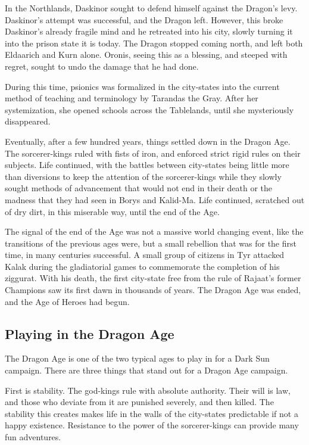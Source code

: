 In the Northlands, Daskinor sought to defend himself against the Dragon's levy. Daskinor's attempt was successful, and the Dragon left. However, this broke Daskinor's already fragile mind and he retreated into his city, slowly turning it into the prison state it is today. The Dragon stopped coming north, and left both Eldaarich and Kurn alone. Oronis, seeing this as a blessing, and steeped with regret, sought to undo the damage that he had done.

During this time, psionics was formalized in the city-states into the current method of teaching and terminology by Tarandas the Gray. After her systemization, she opened schools across the Tablelands, until she mysteriously disappeared.

Eventually, after a few hundred years, things settled down in the Dragon Age. The sorcerer-kings ruled with fists of iron, and enforced strict rigid rules on their subjects. Life continued, with the battles between city-states being little more than diversions to keep the attention of the sorcerer-kings while they slowly sought methods of advancement that would not end in their death or the madness that they had seen in Borys and Kalid-Ma. Life continued, scratched out of dry dirt, in this miserable way, until the end of the Age.

The signal of the end of the Age was not a massive world changing event, like the transitions of the previous ages were, but a small rebellion that was for the first time, in many centuries successful. A small group of citizens in Tyr attacked Kalak during the gladiatorial games to commemorate the completion of his ziggurat. With his death, the first city-state free from the rule of Rajaat's former Champions saw its first dawn in thousands of years. The Dragon Age was ended, and the Age of Heroes had begun.

\subsection{Playing in the Dragon Age}
The Dragon Age is one of the two typical ages to play in for a Dark Sun campaign. There are three things that stand out for a Dragon Age campaign.

First is stability. The god-kings rule with absolute authority. Their will is law, and those who deviate from it are punished severely, and then killed. The stability this creates makes life in the walls of the city-states predictable if not a happy existence. Resistance to the power of the sorcerer-kings can provide many fun adventures.

